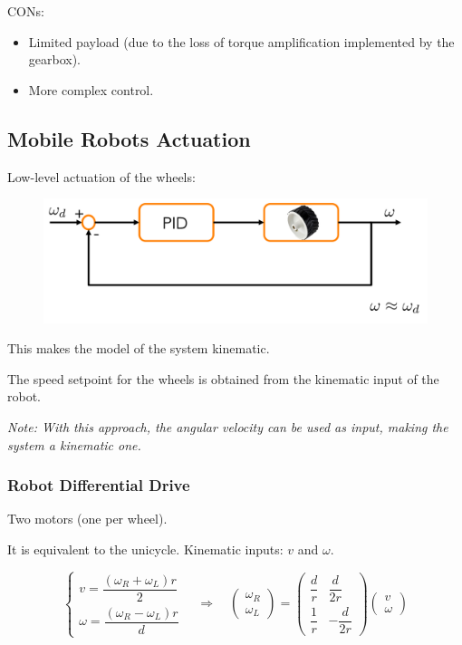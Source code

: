 CONs:
\begin{itemize}
    \item Limited payload (due to the loss of torque amplification implemented by the gearbox).  
    \item More complex control.  
\end{itemize}

\hfill

\subsection*{Mobile Robots Actuation}

Low-level actuation of the wheels:

\begin{figure}[H]
    \centering
    \includegraphics[width=0.75\linewidth]{imgs/low_level_actuation_of_wheels.png}
\end{figure}

This makes the model of the system kinematic.  

The speed setpoint for the wheels is obtained from the kinematic input of the robot.  

\textit{Note: With this approach, the angular velocity can be used as input, making the system a kinematic one.}

\hfill

\subsubsection{Robot Differential Drive}
\label{robot_differential_drive}

Two motors (one per wheel).  

It is equivalent to the unicycle. Kinematic inputs: $v$ and $\omega$.

\[
\begin{cases}
v = \dfrac{(\omega_R + \omega_L)r}{2} \\
\omega = \dfrac{(\omega_R - \omega_L)r}{d}
\end{cases}
\quad \Longrightarrow \quad
\begin{pmatrix}
\omega_R \\
\omega_L
\end{pmatrix}
=
\begin{pmatrix}
\dfrac{d}{r} & \dfrac{d}{2r} \\
\dfrac{1}{r} & -\dfrac{d}{2r}
\end{pmatrix}
\begin{pmatrix}
v \\
\omega
\end{pmatrix}
\]

